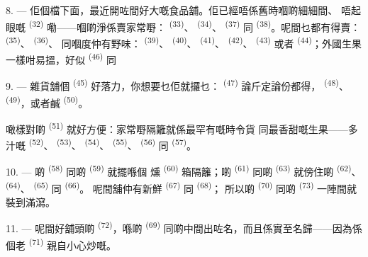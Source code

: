 8. --- 佢個檔下面，最近開咗間好大嘅食品舖。佢已經唔係舊時嗰啲細細間、
唔起眼嘅 \textsuperscript{(32)} 嘞——嗰啲淨係賣家常嘢：
\textsuperscript{(33)}、 \textsuperscript{(34)}、 \textsuperscript{(37)}
同 \textsuperscript{(38)}。呢間乜都有得賣：
\textsuperscript{(35)}、 \textsuperscript{(36)}、
同嗰度仲有野味：
\textsuperscript{(39)}、 \textsuperscript{(40)}、 \textsuperscript{(41)}、
 \textsuperscript{(42)}、 \textsuperscript{(43)} 或者
\textsuperscript{(44)}；外國生果一樣咁易搵，好似 \textsuperscript{(46)} 同

9. --- 雜貨舖個 \textsuperscript{(45)} 好落力，你想要乜佢就攞乜：
 \textsuperscript{(47)} 論斤定論份都得， \textsuperscript{(48)}、
 \textsuperscript{(49)}，或者鹹 \textsuperscript{(50)}。

噉樣對啲 \textsuperscript{(51)} 就好方便：家常嘢隔籬就係最罕有嘅時令貨
同最香甜嘅生果——多汁嘅 \textsuperscript{(52)}、
\textsuperscript{(53)}、 \textsuperscript{(54)}、 \textsuperscript{(55)}、
 \textsuperscript{(56)} 同 \textsuperscript{(57)}。

\VUsaut{4.0mm}
\VUsaut{3.0mm}

10. --- 啲 \textsuperscript{(58)} 同啲 \textsuperscript{(59)} 就擺喺個
燻 \textsuperscript{(60)} 箱隔籬；啲 \textsuperscript{(61)} 同啲
 \textsuperscript{(63)} 就傍住啲 \textsuperscript{(62)}、
\textsuperscript{(64)}、 \textsuperscript{(65)} 同 \textsuperscript{(66)}。
呢間舖仲有新鮮 \textsuperscript{(67)} 同 \textsuperscript{(68)}；
所以啲 \textsuperscript{(70)} 同啲 \textsuperscript{(73)} 一陣間就裝到滿瀉。

11. --- 呢間好舖頭啲 \textsuperscript{(72)}，喺啲
\textsuperscript{(69)} 同啲中間出咗名，而且係實至名歸——因為係個老
 \textsuperscript{(71)} 親自小心炒嘅。

\VUsaut{4.0mm}
\VUsaut{3.0mm}

